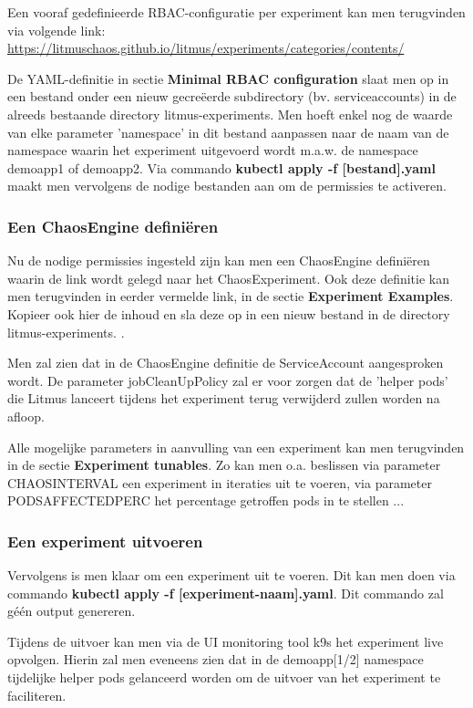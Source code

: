 Een vooraf gedefinieerde RBAC-configuratie per experiment kan men terugvinden via volgende link: \url{https://litmuschaos.github.io/litmus/experiments/categories/contents/}

De YAML-definitie in sectie {\bf Minimal RBAC configuration} slaat men op in een bestand onder een nieuw gecreëerde subdirectory (bv. serviceaccounts) in de alreeds bestaande directory litmus-experiments. Men hoeft enkel nog de waarde van elke parameter 'namespace' in dit bestand aanpassen naar de naam van de namespace waarin het experiment uitgevoerd wordt m.a.w. de namespace demoapp1 of demoapp2. \newline Via commando {\bf kubectl apply -f [bestand].yaml} maakt men vervolgens de nodige bestanden aan om de permissies te activeren.  

\subsubsection{Een ChaosEngine definiëren}

Nu de nodige permissies ingesteld zijn kan men een ChaosEngine definiëren waarin de link wordt gelegd naar het ChaosExperiment. Ook deze definitie kan men terugvinden in eerder vermelde link, in de sectie {\bf Experiment Examples}. Kopieer ook hier de inhoud en sla deze op in een nieuw bestand in de directory litmus-experiments. \autocite{Experiments2022}. 

Men zal zien dat in de ChaosEngine definitie de ServiceAccount aangesproken wordt. De parameter jobCleanUpPolicy zal er voor zorgen dat de 'helper pods' die Litmus lanceert tijdens het experiment terug verwijderd zullen worden na afloop.

Alle mogelijke parameters in aanvulling van een experiment kan men terugvinden in de sectie {\bf Experiment tunables}. Zo kan men o.a. beslissen via parameter CHAOS\textunderscore INTERVAL een experiment in iteraties uit te voeren, via parameter PODS\textunderscore AFFECTED\textunderscore PERC het percentage getroffen pods in te stellen ... 

\subsubsection{Een experiment uitvoeren}
\label{subsec:experimentuitvoeren}
Vervolgens is men klaar om een experiment uit te voeren. Dit kan men doen via commando {\bf kubectl apply -f [experiment-naam].yaml}. Dit commando zal géén output genereren. 

Tijdens de uitvoer kan men via de UI monitoring tool k9s het experiment live opvolgen. Hierin zal men eveneens zien dat in de demoapp[1/2] namespace tijdelijke helper pods gelanceerd worden om de uitvoer van het experiment te faciliteren. 

